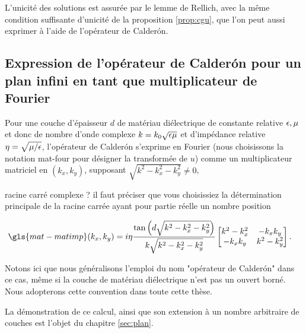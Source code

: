   L'unicité des solutions est assurée par le lemme de Rellich, avec la même condition suffisante d'unicité de la proposition \ref{prop:cgu}, que l'on peut aussi exprimer à l'aide de l'opérateur de Calderón.

  \subsection{Expression de l'opérateur de Calderón pour un plan infini en tant que multiplicateur de Fourier}

    Pour une couche d'épaisseur \(d\) de matériau diélectrique de constante relative \(\epsilon,\mu\) et donc de nombre d'onde complexe \(k = k_0\sqrt{\epsilon\mu}\) et d'impédance relative \(\eta=\sqrt{{\mu}/{\epsilon}}\), l'opérateur de Calderón s'exprime en Fourier (nous choisissons la notation \gls{mat-four} pour désigner la transformée de \(u\)) comme un multiplicateur matriciel en \((k_x,k_y)\), supposant \(\sqrt{k^2-k_x^2-k_y^2}\not=0\), 
    \begin{REM}
    racine carré complexe ? il faut préciser que vous choisissiez la détermination principale de la racine carrée ayant pour partie réelle un nombre position
\end{REM}

    \begin{align*}
      \gls{mat-matimp}(k_x,k_y) &= i\eta\frac{\tan\left(d\sqrt{k^2-k_x^2-k_y^2}\right)}{k \sqrt{k^2-k_x^2-k_y^2}}
      \begin{bmatrix}
        k^2-k_x^2  & -k_xk_y
        \\
        -k_xk_y & k^2-k_y^2
      \end{bmatrix}.
    \end{align*}

    Notons ici que nous généralisons l'emploi du nom "opérateur de Calderón" dans ce cas, même si la couche de matériau diélectrique n'est pas un ouvert borné. Nous adopterons cette convention dans toute cette thèse. 
    
    La démonstration de ce calcul, ainsi que son extension à un nombre arbitraire de couches est l'objet du chapitre \ref{sec:plan}.

